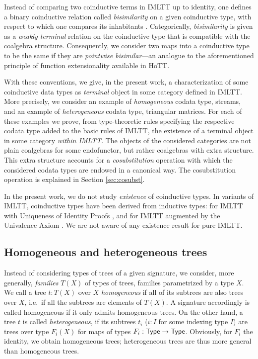 \documentclass[a4paper,USenglish]{lipics}
\newcommand{\parencite}[1]{\cite{#1}}
\begin{document}
 Instead of comparing two coinductive terms in IMLTT up to identity, one defines a 
 binary coinductive relation called \emph{bisimilarity} on a given coinductive type, with respect to which one compares its inhabitants  \parencite{DBLP:conf/types/Coquand93}. 
 Categorically, \emph{bisimilarity} is given as a \emph{weakly terminal} relation on the coinductive type that is compatible with the coalgebra structure.
 Consequently, we consider two maps into a coinductive type to be the same if they are \emph{pointwise bisimilar}---an analogue
 to the aforementioned principle of function extensionality available in HoTT. 
 
 With these conventions, we give, in the present work, a characterization of some coinductive data types as \emph{terminal} object in some category 
 defined in IMLTT.
 More precisely, we consider an example of \emph{homogeneous} codata type, streams, and 
 an example of \emph{heterogeneous} codata type, triangular matrices.
 For each of these examples we prove, 
 from type-theoretic rules specifying the respective codata type added to the basic rules of IMLTT,
 the existence of a terminal object in some category \emph{within IMLTT}.
 The objects of the considered categories are not plain coalgebras for some endofunctor, but rather coalgebras with extra structure.
 This extra structure accounts for a \emph{cosubstitution} operation with which the considered codata types are endowed in a canonical way.
 The cosubstitution operation is explained in Section \ref{sec:cosubst}.

 In the present work, we do not study \emph{existence} of coinductive types. 
 In variants of IMLTT, coinductive types have been derived from inductive types: 
 for IMLTT with Uniqueness of Identity Proofs \cite{indexed_containers}, and for IMLTT augmented by the Univalence Axiom \cite{ahrens_capriotti_spadotti}.
 We are not aware of any existence result for pure IMLTT.

\subsection{Homogeneous and heterogeneous trees}\label{sec:hom_het}

Instead of considering types of trees of a given signature, we consider, more generally, \emph{families} $T(X)$ of types of trees, families parametrized by a type $X$.
We call a tree $t:T(X)$ over $X$ \emph{homogeneous} if all of its subtrees are also trees over $X$, i.e.\, if all the subtrees are elements of $T(X)$.
A signature accordingly is called homogeneous if it only admits homogeneous trees.
On the other hand, a tree $t$ is called \emph{heterogeneous}, if its subtrees $t_i$ ($i : I$ for some indexing type $I$) are trees over 
type $F_i(X)$ for maps of types $F_i : \mathsf{Type} \to \mathsf{Type}$. Obviously, for $F_i$ the identity, we obtain homogeneous trees; heterogeneous trees are thus more general than
homogeneous trees.
\end{document}
